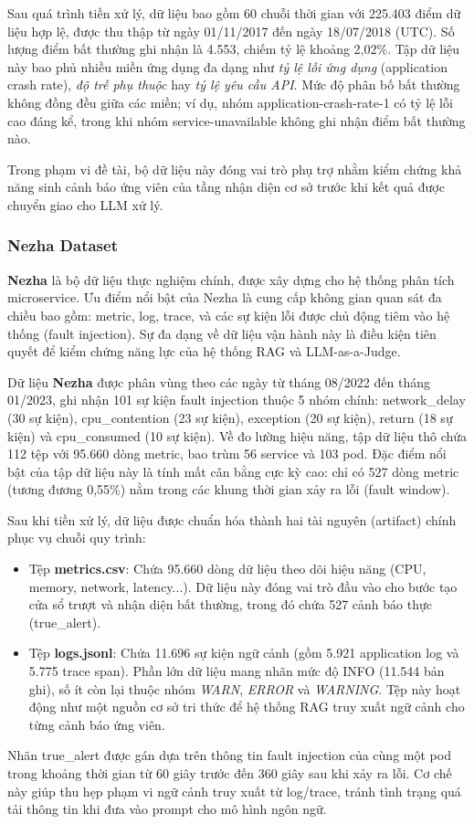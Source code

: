 Sau quá trình tiền xử lý, dữ liệu bao gồm 60 chuỗi thời gian với 225.403 điểm dữ liệu hợp lệ, được thu thập từ ngày 01/11/2017 đến ngày 18/07/2018 (UTC). Số lượng điểm bất thường ghi nhận là 4.553, chiếm tỷ lệ khoảng 2,02\%. Tập dữ liệu này bao phủ nhiều miền ứng dụng đa dạng như \textit{tỷ lệ lỗi ứng dụng} (application crash rate), \textit{độ trễ phụ thuộc} hay \textit{tỷ lệ yêu cầu API}. Mức độ phân bố bất thường không đồng đều giữa các miền; ví dụ, nhóm application-crash-rate-1 có tỷ lệ lỗi cao đáng kể, trong khi nhóm service-unavailable không ghi nhận điểm bất thường nào. 

Trong phạm vi đề tài, bộ dữ liệu này đóng vai trò phụ trợ nhằm kiểm chứng khả năng sinh cảnh báo ứng viên của tầng nhận diện cơ sở trước khi kết quả được chuyển giao cho LLM xử lý.
\subsubsection{Nezha Dataset}
\textbf{Nezha} là bộ dữ liệu thực nghiệm chính, được xây dựng cho hệ thống phân tích microservice. Ưu điểm nổi bật của Nezha là cung cấp không gian quan sát đa chiều bao gồm: metric, log, trace, và các sự kiện lỗi được chủ động tiêm vào hệ thống (fault injection). Sự đa dạng về dữ liệu vận hành này là điều kiện tiên quyết để kiểm chứng năng lực của hệ thống RAG và LLM-as-a-Judge.  

Dữ liệu \textbf{Nezha} được phân vùng theo các ngày từ tháng 08/2022 đến tháng 01/2023, ghi nhận 101 sự kiện fault injection thuộc 5 nhóm chính: network\_delay (30 sự kiện), cpu\_contention (23 sự kiện), exception (20 sự kiện), return (18 sự kiện) và cpu\_consumed (10 sự kiện). Về đo lường hiệu năng, tập dữ liệu thô chứa 112 tệp với 95.660 dòng metric, bao trùm 56 service và 103 pod. Đặc điểm nổi bật của tập dữ liệu này là tính mất cân bằng cực kỳ cao: chỉ có 527 dòng metric (tương đương 0,55\%) nằm trong các khung thời gian xảy ra lỗi (fault window).  

Sau khi tiền xử lý, dữ liệu được chuẩn hóa thành hai tài nguyên (artifact) chính phục vụ chuỗi quy trình:
\begin{itemize}[label=--]
    \item Tệp \textbf{metrics.csv}: Chứa 95.660 dòng dữ liệu theo dõi hiệu năng (CPU, memory, network, latency...). Dữ liệu này đóng vai trò đầu vào cho bước tạo cửa sổ trượt và nhận diện bất thường, trong đó chứa 527 cảnh báo thực (true\_alert).
    \item Tệp \textbf{logs.jsonl}: Chứa 11.696 sự kiện ngữ cảnh (gồm 5.921 application log và 5.775 trace span). Phần lớn dữ liệu mang nhãn mức độ INFO (11.544 bản ghi), số ít còn lại thuộc nhóm \textit{WARN}, \textit{ERROR} và \textit{WARNING}. Tệp này hoạt động như một nguồn cơ sở tri thức để hệ thống RAG truy xuất ngữ cảnh cho từng cảnh báo ứng viên.  
\end{itemize}
Nhãn true\_alert được gán dựa trên thông tin fault injection của cùng một pod trong khoảng thời gian từ 60 giây trước đến 360 giây sau khi xảy ra lỗi. Cơ chế này giúp thu hẹp phạm vi ngữ cảnh truy xuất từ log/trace, tránh tình trạng quá tải thông tin khi đưa vào prompt cho mô hình ngôn ngữ.  
